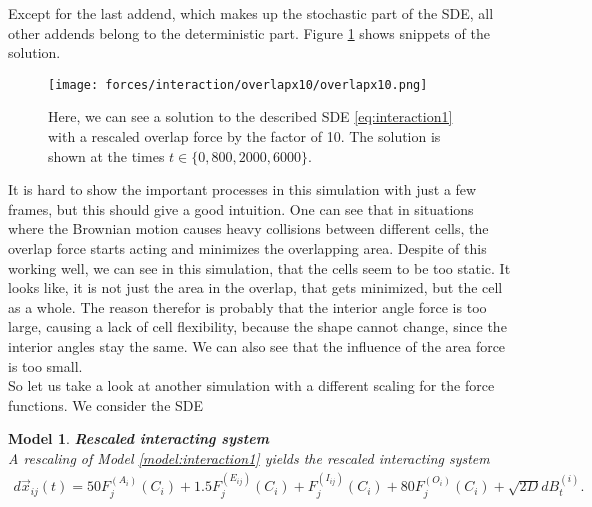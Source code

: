 \documentclass[a4paper,12pt,leqno]{article}
\theoremstyle{plain}
\newtheorem{model}[theorem]{Model}
\theoremstyle{remark}
\begin{document}
Except for the last addend, which makes up the stochastic part of the SDE, all other addends belong to the deterministic part.
Figure \ref{fig:interactionSnippets} shows snippets of the solution. 
\begin{figure}[h!]
	\begin{center}
		\texttt{[image: forces/interaction/overlapx10/overlapx10.png]}
		\caption{Here, we can see a solution to the described SDE \eqref{eq:interaction1} with a rescaled overlap force by the factor of 10. The solution is shown at the times $t \in \{ 0, 800, 2000, 6000\}$.}
		\label{fig:interactionSnippets}
	\end{center}
\end{figure}
It is hard to show the important processes in this simulation with just a few frames, but this should give a good intuition. One can see that in situations where the Brownian motion causes heavy collisions between different cells, the overlap force starts acting and minimizes the overlapping area. Despite of this working well, we can see in this simulation, that the cells seem to be too static. It looks like, it is not just the area in the overlap, that gets minimized, but the cell as a whole. The reason therefor is probably that the interior angle force is too large, causing a lack of cell flexibility, because the shape cannot change, since the interior angles stay the same. We can also see that the influence of the area force is too small. \\
So let us take a look at another simulation with a different scaling for the force functions. We consider the SDE
\begin{model} \textbf{Rescaled interacting system} \label{model:interaction2}\\
	A rescaling of Model \ref{model:interaction1} yields the rescaled interacting system
	\begin{align}
		d\vec{x}_{ij}(t) =  50 F^{(A_i)}_j(C_i) + 1.5 F^{(E_{ij})}_j(C_i) + F^{(I_{ij})}_j(C_i) + 80 F^{(O_i)}_j(C_i) + \sqrt{2D} dB_t^{(i)}. \label{eq:interaction2}
	\end{align}
\end{model}
\end{document}
